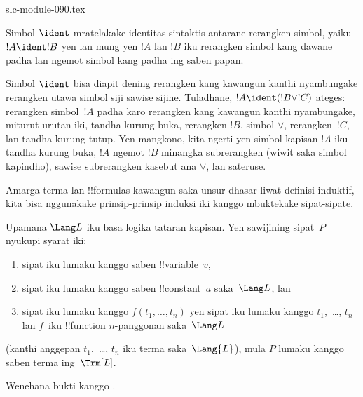 \begin{filecontents*}[overwrite]{slc-module-090.tex}
\begin{defn}
Simbol $\ident$ mratelakake identitas sintaktis antarane rerangken
simbol, yaiku $!A \ident !B$ yen lan mung yen $!A$ lan $!B$ iku
rerangken simbol kang dawane padha lan ngemot simbol kang padha ing
saben papan.
\end{defn}

Simbol $\ident$ bisa diapit dening rerangken kang kawangun kanthi
nyambungake rerangken utawa simbol siji sawise sijine. Tuladhane,
$!A \ident (!B \lor !C)$ ateges: rerangken simbol~$!A$ padha karo
rerangken kang kawangun kanthi nyambungake, miturut urutan iki,
tandha kurung buka, rerangken $!B$, simbol $\lor$, rerangken~$!C$,
lan tandha kurung tutup. Yen mangkono, kita ngerti yen simbol kapisan
$!A$ iku tandha kurung buka, $!A$ ngemot $!B$ minangka subrerangken
(wiwit saka simbol kapindho), sawise subrerangken kasebut ana $\lor$,
lan sateruse.

Amarga terma lan !!{formula}s kawangun saka unsur dhasar liwat definisi
induktif, kita bisa nggunakake prinsip-prinsip induksi iki kanggo
mbuktekake sipat-sipate.

\begin{lem}
    Upamana $\Lang L$ iku basa logika tataran kapisan.
    Yen sawijining sipat~$P$ nyukupi syarat iki:
    \begin{enumerate}
        \item sipat iku lumaku kanggo saben !!{variable}~$v$,
        \item sipat iku lumaku kanggo saben !!{constant}~$a$ saka~$\Lang L$, lan
        \item sipat iku lumaku kanggo $f(t_1,\dotsc,t_n)$ yen sipat iku
        lumaku kanggo $t_1$,~\dots, $t_n$ lan $f$~iku !!{function}
            $n$-panggonan saka~$\Lang L$
    \end{enumerate}
    (kanthi anggepan $t_1$,~\dots, $t_n$ iku terma saka~$\Lang{L}$),
    mula $P$ lumaku kanggo saben terma ing~$\Trm[L]$.
\end{lem}

\begin{prob}
    Wenehana bukti kanggo .
\end{prob}


\end{filecontents*}
